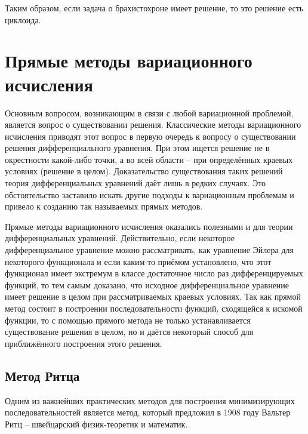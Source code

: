 \noindent Таким образом, если задача о брахистохроне имеет решение, то это решение есть циклоида.


\newpage

\section{Прямые методы вариационного исчисления}

Основным вопросом, возникающим в связи с любой вариационной проблемой, является вопрос о существовании решения. 
Классические методы вариационного исчисления приводят этот вопрос в первую очередь к вопросу о существовании решения дифференциального уравнения. 
При этом ищется решение не в окрестности какой-либо точки, а во всей области -- при определённых краевых условиях (решение в целом). 
Доказательство существования таких решений теория дифференциальных уравнений даёт лишь в редких случаях. 
Это обстоятельство заставило искать другие подходы к вариационным проблемам и привело к созданию так называемых прямых методов.

Прямые методы вариационного исчисления оказались полезными и для теории дифференциальных уравнений. 
Действительно, если некоторое дифференциальное уравнение можно рассматривать, как уравнение Эйлера для некоторого функционала и если каким-то приёмом установлено, 
что этот функционал имеет экстремум в классе достаточное число раз дифференцируемых функций, 
то тем самым доказано, что исходное дифференциальное уравнение имеет решение в целом при рассматриваемых краевых условиях. 
Так как прямой метод состоит в построении последовательности функций, сходящейся к искомой функции, то с помощью прямого метода не только устанавливается существование решения в целом, 
но и даётся некоторый способ для приближённого построения этого решения.


\subsection{Метод Ритца}

Одним из важнейших практических методов для построения минимизирующих последовательностей является метод, который предложил в 1908 году Вальтер Ритц -- швейцарский физик-теоретик и математик.

